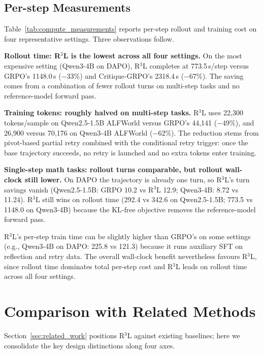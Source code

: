 \documentclass{article} %
\theoremstyle{definition}
\theoremstyle{remark}
\begin{document}
\subsection{Per-step Measurements}



Table~\ref{tab:compute_measurements} reports per-step rollout and training cost on four representative settings. Three observations follow.

\textbf{Rollout time: R$^3$L is the lowest across all four settings.} On the most expensive setting (Qwen3-4B on DAPO), R$^3$L completes at 773.5\,s/step versus GRPO's 1148.0\,s ($-33\%$) and Critique-GRPO's 2318.4\,s ($-67\%$). The saving comes from a combination of fewer rollout turns on multi-step tasks and no reference-model forward pass.

\textbf{Training tokens: roughly halved on multi-step tasks.} R$^3$L uses 22{,}300 tokens/sample on Qwen2.5-1.5B ALFWorld versus GRPO's 44{,}141 ($-49\%$), and 26{,}900 versus 70{,}176 on Qwen3-4B ALFWorld ($-62\%$). The reduction stems from pivot-based partial retry combined with the conditional retry trigger: once the base trajectory succeeds, no retry is launched and no extra tokens enter training.

\textbf{Single-step math tasks: rollout turns comparable, but rollout wall-clock still lower.} On DAPO the trajectory is already one turn, so R$^3$L's turn savings vanish (Qwen2.5-1.5B: GRPO 10.2 vs R$^3$L 12.9; Qwen3-4B: 8.72 vs 11.24). R$^3$L still wins on rollout time (292.4 vs 342.6 on Qwen2.5-1.5B; 773.5 vs 1148.0 on Qwen3-4B) because the KL-free objective removes the reference-model forward pass.

R$^3$L's per-step train time can be slightly higher than GRPO's on some settings (e.g., Qwen3-4B on DAPO: 225.8 vs 121.3) because it runs auxiliary SFT on reflection and retry data. The overall wall-clock benefit nevertheless favours R$^3$L, since rollout time dominates total per-step cost and R$^3$L leads on rollout time across all four settings.

\section{Comparison with Related Methods}
\label{sec:related_comparison}

Section~\ref{sec:related_work} positions R$^3$L against existing baselines; here we consolidate the key design distinctions along four axes.
\end{document}
